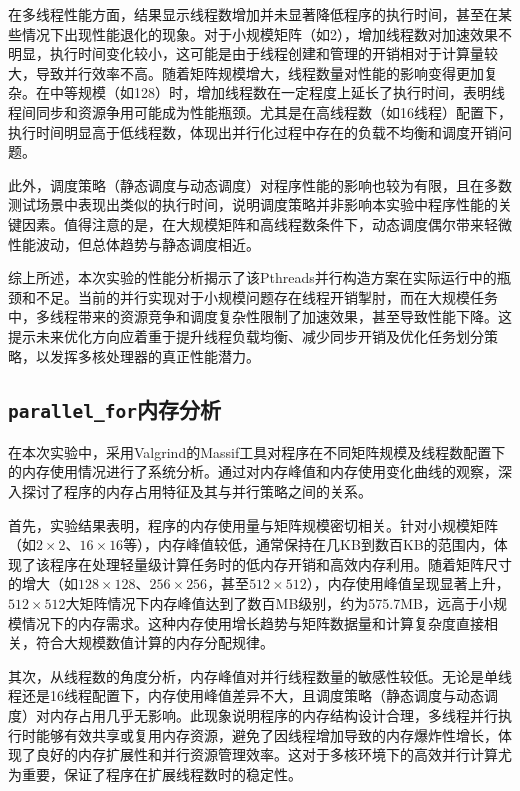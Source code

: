 \documentclass[a4paper, utf8]{ctexart}
\begin{document}
	在多线程性能方面，结果显示线程数增加并未显著降低程序的执行时间，甚至在某些情况下出现性能退化的现象。对于小规模矩阵（如2），增加线程数对加速效果不明显，执行时间变化较小，这可能是由于线程创建和管理的开销相对于计算量较大，导致并行效率不高。随着矩阵规模增大，线程数量对性能的影响变得更加复杂。在中等规模（如128）时，增加线程数在一定程度上延长了执行时间，表明线程间同步和资源争用可能成为性能瓶颈。尤其是在高线程数（如16线程）配置下，执行时间明显高于低线程数，体现出并行化过程中存在的负载不均衡和调度开销问题。
	
	此外，调度策略（静态调度与动态调度）对程序性能的影响也较为有限，且在多数测试场景中表现出类似的执行时间，说明调度策略并非影响本实验中程序性能的关键因素。值得注意的是，在大规模矩阵和高线程数条件下，动态调度偶尔带来轻微性能波动，但总体趋势与静态调度相近。
	
	综上所述，本次实验的性能分析揭示了该Pthreads并行构造方案在实际运行中的瓶颈和不足。当前的并行实现对于小规模问题存在线程开销掣肘，而在大规模任务中，多线程带来的资源竞争和调度复杂性限制了加速效果，甚至导致性能下降。这提示未来优化方向应着重于提升线程负载均衡、减少同步开销及优化任务划分策略，以发挥多核处理器的真正性能潜力。
	
	\subsection{\texttt{parallel\_for}内存分析}
	
	在本次实验中，采用Valgrind的Massif工具对程序在不同矩阵规模及线程数配置下的内存使用情况进行了系统分析。通过对内存峰值和内存使用变化曲线的观察，深入探讨了程序的内存占用特征及其与并行策略之间的关系。
	
	首先，实验结果表明，程序的内存使用量与矩阵规模密切相关。针对小规模矩阵（如$2\times2$、$16\times16$等），内存峰值较低，通常保持在几KB到数百KB的范围内，体现了该程序在处理轻量级计算任务时的低内存开销和高效内存利用。随着矩阵尺寸的增大（如$128\times128$、$256\times256$，甚至$512\times512$），内存使用峰值呈现显著上升，$512\times512$大矩阵情况下内存峰值达到了数百MB级别，约为575.7MB，远高于小规模情况下的内存需求。这种内存使用增长趋势与矩阵数据量和计算复杂度直接相关，符合大规模数值计算的内存分配规律。
	
	其次，从线程数的角度分析，内存峰值对并行线程数量的敏感性较低。无论是单线程还是16线程配置下，内存使用峰值差异不大，且调度策略（静态调度与动态调度）对内存占用几乎无影响。此现象说明程序的内存结构设计合理，多线程并行执行时能够有效共享或复用内存资源，避免了因线程增加导致的内存爆炸性增长，体现了良好的内存扩展性和并行资源管理效率。这对于多核环境下的高效并行计算尤为重要，保证了程序在扩展线程数时的稳定性。
	
\end{document}
